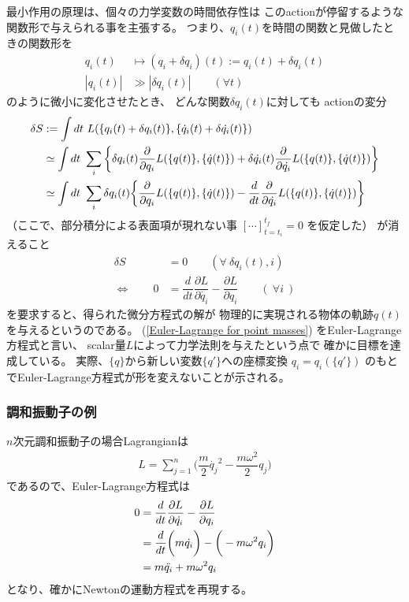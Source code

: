 \documentclass[dvipdfmx]{jsarticle}
\begin{document}
最小作用の原理は、個々の力学変数の時間依存性は
このactionが停留するような関数形で与えられる事を主張する。
つまり、$q_i(t)$を時間の関数と見做したときの関数形を
\begin{align}
  q_i(t) &\mapsto (q_i+\delta q_i)(t) := q_i(t) + \delta q_i(t)
  \\
  | q_i(t) | & \gg | \delta q_i(t) |
  \qquad (\forall t)
\end{align}
のように微小に変化させたとき、
どんな関数$\delta q_i(t)$に対しても
actionの変分
\begin{align}
  \delta S &:= \int dt\ L(\{ q_i(t) + \delta q_i(t) \},
  \{ \dot{q}_i(t) + \delta \dot{q_i}(t) \} )
\notag\\&\simeq
  \int dt\ \sum_i
  \bigg\{
    \delta q_i(t)
    \dfrac{\partial}{\partial q_i}
    L(\{ q(t) \},
    \{ \dot{q}(t) \} )
+
    \delta \dot{q_i}(t)
    \dfrac{\partial}{\partial \dot{q_i}}
    L(\{ q(t) \},
    \{ \dot{q}(t) \} )
  \bigg\}
\notag\\&\simeq
\int dt\ \sum_i
\delta q_i(t)
\bigg\{
  \dfrac{\partial}{\partial q_i}
  L(\{ q(t) \},
  \{ \dot{q}(t) \} )
-
  \dfrac{d}{dt}
  \dfrac{\partial}{\partial \dot{q_i}}
  L(\{ q(t) \},
  \{ \dot{q}(t) \} )
\bigg\}
\end{align}
（ここで、部分積分による表面項が現れない事
$[\cdots]_{t=t_i}^{t_f}=0$
を仮定した）
が消えること
\begin{align}
  \delta S &= 0
  \qquad (\forall\ \delta q_i(t), i)
\\\Leftrightarrow\qquad
  0 &= 
  \dfrac{d}{dt}\dfrac{\partial L}{\partial \dot{q_i} }
  - \dfrac{\partial L}{\partial q_i }
  \qquad (\ \forall i\ )
\label{Euler-Lagrange for point masses}
\end{align}
を要求すると、得られた微分方程式の解が
物理的に実現される物体の軌跡${q(t)}$
を与えるというのである。
(\ref{Euler-Lagrange for point masses})
をEuler-Lagrange方程式と言い、
scalar量$L$によって力学法則を与えたという点で
確かに目標を達成している。
実際、$\{q\}$から新しい変数$\{ q'\}$への座標変換
$q_i = q_i(\{q'\})$
のもとでEuler-Lagrange方程式が形を変えないことが示される。

\subsubsection{調和振動子の例}

$n$次元調和振動子の場合Lagrangianは
\begin{align}
  L = \sum_{j=1}^n
  \bigg(
    \dfrac{m}{2}\dot{q_j}^2
  -
    \dfrac{m\omega^2}{2} q_j
  \bigg)
\end{align}
であるので、Euler-Lagrange方程式は
\begin{align}
  0 &= 
  \dfrac{d}{dt}\dfrac{\partial L}{\partial \dot{q_i} }
  - \dfrac{\partial L}{\partial q_i }
\notag\\&=
  \dfrac{d}{dt}
  \bigg(
    m\dot{q_i}
  \bigg)
  - 
  \bigg(
  -
    m\omega^2 q_i
  \bigg)
\notag\\&=
    m\ddot{q_i}
  +
    m\omega^2 q_i
\end{align}
となり、確かにNewtonの運動方程式を再現する。
\end{document}
